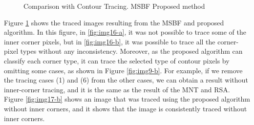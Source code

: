 \begin{figure}[htbp]
	\centering

	\caption{Comparison with Contour Tracing. \protect{} MSBF \protect{} Proposed method}
	\label{fig:image16}
\end{figure}


Figure \ref{fig:image16} shows the traced images resulting from the MSBF and proposed algorithm. In this figure, in \ref{fig:img16-a}, it was not possible to trace some of the inner corner pixels, but in \ref{fig:img16-b}, it was possible to trace all the corner-pixel types without any inconsistency. Moreover, as the proposed algorithm can classify each corner type, it can trace the selected type of contour pixels by omitting some cases, as shown in Figure \ref{fig:img9-b}. For example, if we remove the tracing cases (1) and (6) from the other cases, we can obtain a result without inner-corner tracing, and it is the same as the result of the MNT and RSA. Figure \ref{fig:img17-b} shows an image that was traced using the proposed algorithm without inner corners, and it shows that the image is consistently traced without inner corners.

